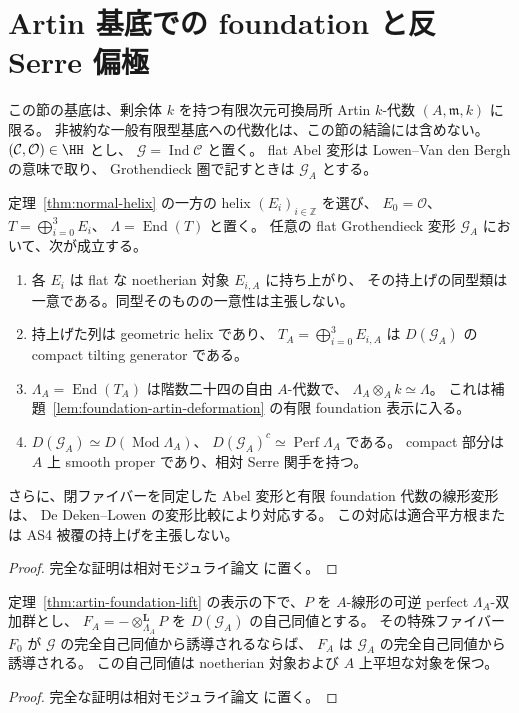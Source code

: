 \section{Artin 基底での foundation と反 Serre 偏極}
\label{sec:artin-foundation}

この節の基底は、剰余体 $k$ を持つ有限次元可換局所 Artin
$k$-代数 $(A,\mathfrak m,k)$ に限る。
非被約な一般有限型基底への代数化は、この節の結論には含めない。
$(\mathcal C,\mathcal O)\in\HH$ とし、
$\mathcal G=\operatorname{Ind}\mathcal C$ と置く。
flat Abel 変形は Lowen--Van den Bergh の意味で取り、
Grothendieck 圏で記すときは $\mathcal G_A$ とする。

\begin{theorem}
\label{thm:artin-foundation-lift}
定理~\ref{thm:normal-helix} の一方の helix $(E_i)_{i\in\mathbb Z}$ を選び、
$E_0=\mathcal O$、$T=\bigoplus_{i=0}^{3}E_i$、
$\Lambda=\operatorname{End}(T)$ と置く。
任意の flat Grothendieck 変形 $\mathcal G_A$ において、次が成立する。
\begin{enumerate}
\item 各 $E_i$ は flat な noetherian 対象 $E_{i,A}$ に持ち上がり、
  その持上げの同型類は一意である。同型そのものの一意性は主張しない。
\item 持上げた列は geometric helix であり、
  $T_A=\bigoplus_{i=0}^{3}E_{i,A}$ は $D(\mathcal G_A)$ の compact tilting generator である。
\item $\Lambda_A=\operatorname{End}(T_A)$ は階数二十四の自由 $A$-代数で、
  $\Lambda_A\otimes_A k\simeq\Lambda$。
  これは補題~\ref{lem:foundation-artin-deformation} の有限 foundation 表示に入る。
\item $D(\mathcal G_A)\simeq D(\operatorname{Mod}\Lambda_A)$、
  $D(\mathcal G_A)^c\simeq\operatorname{Perf}\Lambda_A$ である。
  compact 部分は $A$ 上 smooth proper であり、相対 Serre 関手を持つ。
\end{enumerate}
さらに、閉ファイバーを同定した Abel 変形と有限 foundation 代数の線形変形は、
De Deken--Lowen の変形比較により対応する。
この対応は適合平方根または AS4 被覆の持上げを主張しない。
\end{theorem}
\begin{proof}
完全な証明は相対モジュライ論文 \cite[\texttt{artin_foundation}]{QuadricModuli2026} に置く。
\end{proof}

\begin{lemma}
\label{lem:artin-morita-heart-exact}
定理~\ref{thm:artin-foundation-lift} の表示の下で、$P$ を
$A$-線形の可逆 perfect $\Lambda_A$-双加群とし、
$F_A=-\otimes_{\Lambda_A}^{\mathbf L}P$ を $D(\mathcal G_A)$ の自己同値とする。
その特殊ファイバー $F_0$ が $\mathcal G$ の完全自己同値から誘導されるならば、
$F_A$ は $\mathcal G_A$ の完全自己同値から誘導される。
この自己同値は noetherian 対象および $A$ 上平坦な対象を保つ。
\end{lemma}
\begin{proof}
完全な証明は相対モジュライ論文 \cite[\texttt{artin_foundation}]{QuadricModuli2026} に置く。
\end{proof}

